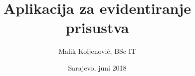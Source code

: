 \documentclass[a4paper,11pt,titlepage]{report}
\title{Aplikacija za evidentiranje prisustva}
\author{Malik Koljenović, BSc IT}
\date{Sarajevo, juni 2018}
\begin{document}
	
	
	\tableofcontents
	\listoffigures
	\listoftables
	
	
	
	
	
	
	
	\begin{appendices}
		
		
		
	\end{appendices}
	
	
	
\end{document}
